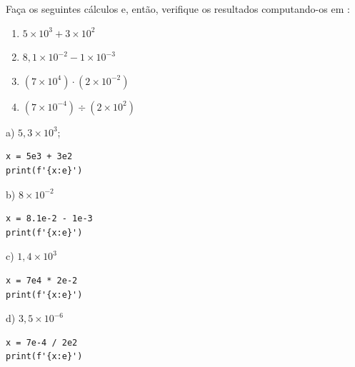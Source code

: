 \begin{exer}
  Faça os seguintes cálculos e, então, verifique os resultados computando-os em {\python}:
  \begin{enumerate}
  \item $5\times 10^{3} + 3\times 10^{2}$
  \item $8,1\times 10^{-2} - 1\times 10^{-3}$
  \item $\left(7\times 10^4\right)\cdot (2\times 10^{-2})$
  \item $\left(7\times 10^{-4}\right)\div (2\times 10^{2})$
  \end{enumerate}
\end{exer}
\begin{resp}
  a) $5,3\times 10^3$;

\begin{lstlisting}
x = 5e3 + 3e2
print(f'{x:e}')
\end{lstlisting}
  
  b) $8\times 10^{-2}$

\begin{lstlisting}
x = 8.1e-2 - 1e-3
print(f'{x:e}')
\end{lstlisting}

  c) $1,4\times 10^{3}$

\begin{lstlisting}
x = 7e4 * 2e-2
print(f'{x:e}')
\end{lstlisting}

  d) $3,5\times 10^{-6}$

\begin{lstlisting}
x = 7e-4 / 2e2
print(f'{x:e}')
\end{lstlisting}

\end{resp}


